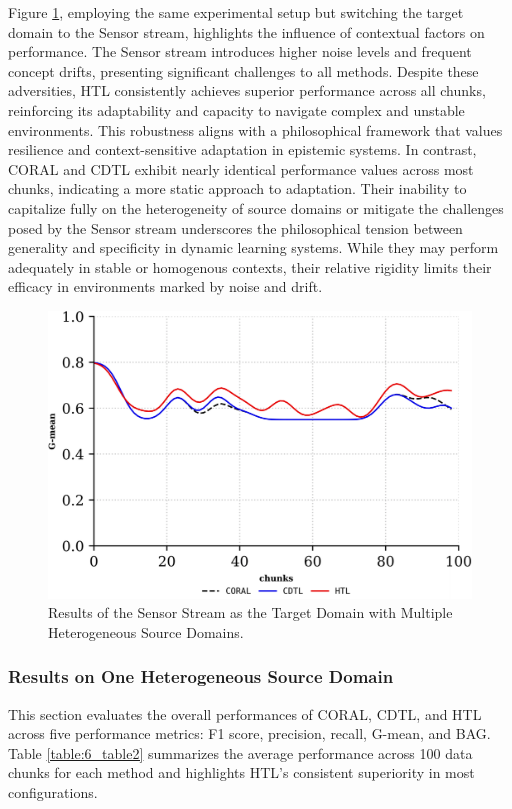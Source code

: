 Figure \ref{fig:6_exp5}, employing the same experimental setup but switching the target domain to the Sensor stream, highlights the influence of contextual factors on performance. The Sensor stream introduces higher noise levels and frequent concept drifts, presenting significant challenges to all methods. Despite these adversities, HTL consistently achieves superior performance across all chunks, reinforcing its adaptability and capacity to navigate complex and unstable environments. This robustness aligns with a philosophical framework that values resilience and context-sensitive adaptation in epistemic systems. In contrast, CORAL and CDTL exhibit nearly identical performance values across most chunks, indicating a more static approach to adaptation. Their inability to capitalize fully on the heterogeneity of source domains or mitigate the challenges posed by the Sensor stream underscores the philosophical tension between generality and specificity in dynamic learning systems. While they may perform adequately in stable or homogenous contexts, their relative rigidity limits their efficacy in environments marked by noise and drift.
\begin{figure}[H]
	\centering
	\includegraphics[width=0.6\linewidth]{6_transfer_learning/figures/exp3.png}
  \caption{Results of the Sensor Stream as the Target Domain with Multiple Heterogeneous Source Domains.}

	\label{fig:6_exp5}
\end{figure}

\subsubsection{Results on One Heterogeneous Source Domain}
This section evaluates the overall performances of CORAL, CDTL, and HTL across five performance metrics: F1 score, precision, recall, G-mean, and BAG. Table \ref{table:6_table2} summarizes the average performance across 100 data chunks for each method and highlights HTL's consistent superiority in most configurations.

